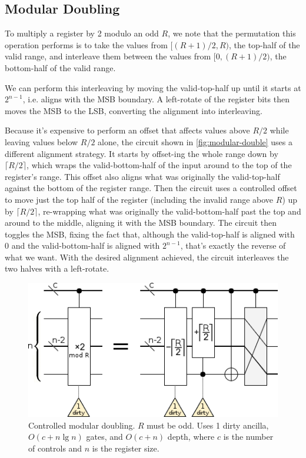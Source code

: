 \documentclass[twocolumn,longbibliography]{quantumarticle-customized}
\begin{document}
\subsection{Modular Doubling}

To multiply a register by 2 modulo an odd $R$, we note that the permutation this operation performs is to take the values from $[(R+1)/2, R)$, the top-half of the valid range, and interleave them between the values from $[0, (R+1)/2)$, the bottom-half of the valid range.

We can perform this interleaving by moving the valid-top-half up until it starts at $2^{n-1}$, i.e. aligns with the MSB boundary.
A left-rotate of the register bits then moves the MSB to the LSB, converting the alignment into interleaving.

Because it's expensive to perform an offset that affects values above $R/2$ while leaving values below $R/2$ alone, the circuit shown in \autoref{fig:modular-double} uses a different alignment strategy.
It starts by offset-ing the whole range down by $\lceil R/2 \rceil$, which wraps the valid-bottom-half of the input around to the top of the register's range.
This offset also aligns what was originally the valid-top-half against the bottom of the register range.
Then the circuit uses a controlled offset to move just the top half of the register (including the invalid range above $R$) up by $\lceil R/2 \rceil$, re-wrapping what was originally the valid-bottom-half past the top and around to the middle, aligning it with the MSB boundary.
The circuit then toggles the MSB, fixing the fact that, although the valid-top-half is aligned with 0 and the valid-bottom-half is aligned with $2^{n-1}$, that's exactly the reverse of what we want.
With the desired alignment achieved, the circuit interleaves the two halves with a left-rotate.


\begin{figure}
  \centering
  \includegraphics[width=\linewidth]{assets/controlled-modular-double.png}
  \caption{
    Controlled modular doubling.
    $R$ must be odd.
    Uses 1 dirty ancilla, $O(c + n \lg n)$ gates, and $O(c + n)$ depth, where $c$ is the number of controls and $n$ is the register size.
  }
  \label{fig:modular-double}
\end{figure}
\end{document}
